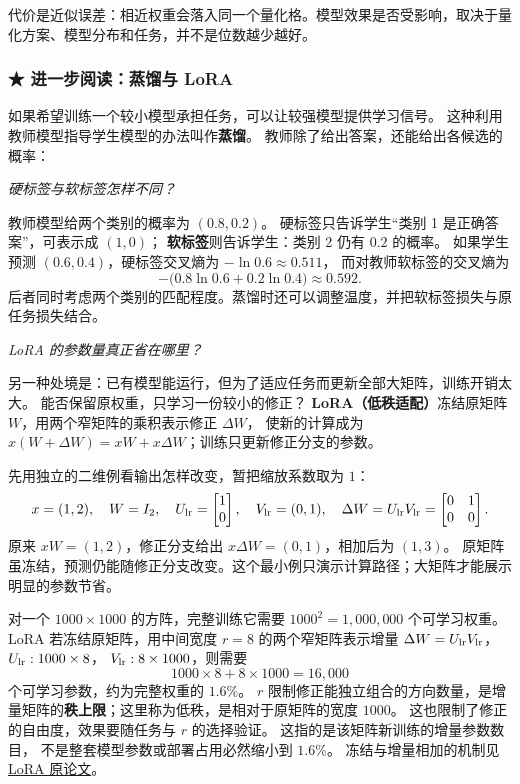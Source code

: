 代价是近似误差：相近权重会落入同一个量化格。模型效果是否受影响，取决于量化方案、模型分布和任务，并不是位数越少越好。

\subsubsection*{\texorpdfstring{{\symboliconfont ★}}{★} 进一步阅读：蒸馏与 LoRA}

如果希望训练一个较小模型承担任务，可以让较强模型提供学习信号。
\label{concept:distillation}%
这种利用教师模型指导学生模型的办法叫作\textbf{蒸馏}。
教师除了给出答案，还能给出各候选的概率：

\begin{example}
\noindent\emph{硬标签与软标签怎样不同？}\par

教师模型给两个类别的概率为 $(0.8,0.2)$。
硬标签只告诉学生“类别 1 是正确答案”，可表示成 $(1,0)$；
\textbf{软标签}则告诉学生：类别 2 仍有 $0.2$ 的概率。
如果学生预测 $(0.6,0.4)$，硬标签交叉熵为
$-\ln0.6\approx0.511$，
而对教师软标签的交叉熵为
\[
-\bigl(0.8\ln0.6+0.2\ln0.4\bigr)\approx0.592.
\]
后者同时考虑两个类别的匹配程度。蒸馏时还可以调整温度，并把软标签损失与原任务损失结合。
\end{example}

\begin{example}
\noindent\emph{LoRA 的参数量真正省在哪里？}\par

另一种处境是：已有模型能运行，但为了适应任务而更新全部大矩阵，训练开销太大。
能否保留原权重，只学习一份较小的修正？
\label{concept:lora}%
\textbf{LoRA（低秩适配）}冻结原矩阵 $W$，用两个窄矩阵的乘积表示修正 $\Delta W$，
使新的计算成为 $x(W+\Delta W)=xW+x\Delta W$；训练只更新修正分支的参数。

先用独立的二维例看输出怎样改变，暂把缩放系数取为 $1$：
\[
x=(1,2),\quad W=I_2,\quad
U_{\rm lr}=\begin{bmatrix}1\\0\end{bmatrix},\quad V_{\rm lr}=(0,1),\quad
\Delta W=U_{\rm lr}V_{\rm lr}=\begin{bmatrix}0&1\\0&0\end{bmatrix}.
\]
原来 $xW=(1,2)$，修正分支给出 $x\Delta W=(0,1)$，相加后为 $(1,3)$。
原矩阵虽冻结，预测仍能随修正分支改变。这个最小例只演示计算路径；大矩阵才能展示明显的参数节省。

对一个 $1000\times1000$ 的方阵，完整训练它需要
$1000^2=1{,}000{,}000$ 个可学习权重。
LoRA 若冻结原矩阵，用中间宽度 $r=8$ 的两个窄矩阵表示增量
$\Delta W=U_{\rm lr}V_{\rm lr}$，$U_{\rm lr}:1000\times8$，
$V_{\rm lr}:8\times1000$，则需要
\[
1000\times8+8\times1000
=\boxed{16{,}000}
\]
个可学习参数，约为完整权重的 $1.6\%$。
$r$ 限制修正能独立组合的方向数量，是增量矩阵的\textbf{秩上限}；这里称为低秩，是相对于原矩阵的宽度 $1000$。
这也限制了修正的自由度，效果要随任务与 $r$ 的选择验证。
这指的是该矩阵新训练的增量参数数目，
不是整套模型参数或部署占用必然缩小到 $1.6\%$。
冻结与增量相加的机制见\hyperref[source:lora]{LoRA 原论文}。
\end{example}

